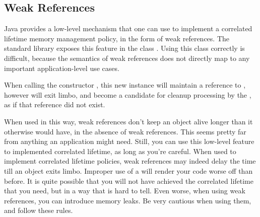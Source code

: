 \subsection{Weak References}

Java provides a low-level mechanism that one can use to implement a
correlated lifetime memory management policy, in the form of weak references.
The standard library exposes this feature in the class
. Using this class correctly is
difficult, because the semantics of weak references does not directly map to
any important application-level use cases.

\begin{definition}
When calling the constructor ,
 this new instance will maintain a reference to , however
  will exit limbo, and become a candidate for cleanup processing by 
the \jre, as if that reference did not exist.
\end{definition} 

When used in this way, weak references don't keep an object alive longer than it
otherwise would have, in the absence of weak references. 
This seems pretty far from anything an application might
need. Still, you can use this low-level feature to implemented correlated
lifetime, as long as you're careful. 
When used to implement correlated lifetime policies, weak references may
indeed delay the time till an object exits limbo.
Improper use of a  will
render your code worse off than before. It is quite possible that you will not
have achieved the correlated lifetime that you need, but in a way that is hard
to tell. Even worse, when using weak references, you can introduce memory
leaks. Be very cautious when using them, and follow these rules.

